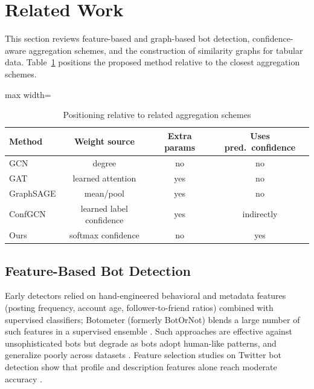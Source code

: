 \documentclass{csimq}
\begin{document}
\section{Related Work}

This section reviews feature-based and graph-based bot detection, confidence-aware aggregation schemes, and the construction of similarity graphs for tabular data. Table~\ref{tab:positioning} positions the proposed method relative to the closest aggregation schemes.

\begin{table}[htbp]
\caption{Positioning relative to related aggregation schemes}
\label{tab:positioning}
\centering
\begin{adjustbox}{max width=\textwidth}
\begin{tabular}{@{}lccc@{}}
\toprule
Method & Weight source & Extra params & Uses pred.\ confidence\\
\midrule
GCN \cite{kipf2017gcn} & degree & no & no\\
GAT \cite{velickovic2018gat} & learned attention & yes & no\\
GraphSAGE \cite{hamilton2017sage} & mean/pool & yes & no\\
ConfGCN \cite{vashishth2019confgcn} & learned label confidence & yes & indirectly\\
Ours & softmax confidence & no & yes\\
\bottomrule
\end{tabular}\end{adjustbox}
\end{table}

\subsection{Feature-Based Bot Detection}
Early detectors relied on hand-engineered behavioral and metadata features (posting frequency, account age, follower-to-friend ratios) combined with supervised classifiers; Botometer (formerly BotOrNot) blends a large number of such features in a supervised ensemble \cite{davis2016botornot}. Such approaches are effective against unsophisticated bots but degrade as bots adopt human-like patterns, and generalize poorly across datasets \cite{yang2020scalable,cresci2020decade}. Feature selection studies on Twitter bot detection show that profile and description features alone reach moderate accuracy \cite{lee2021discriminative}.
\end{document}
